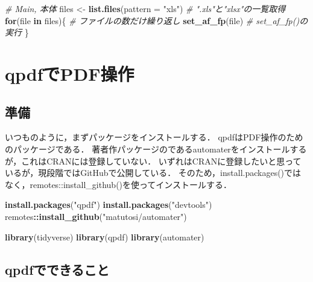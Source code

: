 \documentclass[
]{article}
\newenvironment{Shaded}{\begin{snugshade}}{\end{snugshade}}
\newcommand{\AttributeTok}[1]{\textcolor[rgb]{0.13,0.29,0.53}{#1}}
\newcommand{\CommentTok}[1]{\textcolor[rgb]{0.56,0.35,0.01}{\textit{#1}}}
\newcommand{\ControlFlowTok}[1]{\textcolor[rgb]{0.13,0.29,0.53}{\textbf{#1}}}
\newcommand{\FunctionTok}[1]{\textcolor[rgb]{0.13,0.29,0.53}{\textbf{#1}}}
\newcommand{\NormalTok}[1]{#1}
\newcommand{\OtherTok}[1]{\textcolor[rgb]{0.56,0.35,0.01}{#1}}
\newcommand{\SpecialCharTok}[1]{\textcolor[rgb]{0.81,0.36,0.00}{\textbf{#1}}}
\newcommand{\StringTok}[1]{\textcolor[rgb]{0.31,0.60,0.02}{#1}}
\begin{document}
\begin{Shaded}
\begin{Highlighting}[]
  \CommentTok{\# Main, 本体}
\NormalTok{files }\OtherTok{\textless{}{-}} \FunctionTok{list.files}\NormalTok{(}\AttributeTok{pattern =} \StringTok{"xls"}\NormalTok{) }\CommentTok{\# ".xls"と"xlsx"の一覧取得}
\ControlFlowTok{for}\NormalTok{(file }\ControlFlowTok{in}\NormalTok{ files)\{                  }\CommentTok{\# ファイルの数だけ繰り返し}
  \FunctionTok{set\_af\_fp}\NormalTok{(file)                    }\CommentTok{\# set\_af\_fp()の実行}
\NormalTok{\}}
\end{Highlighting}
\end{Shaded}

\hypertarget{qpdf}{%
\section{qpdfでPDF操作}\label{qpdf}}

\hypertarget{ux6e96ux5099-15}{%
\subsection{準備}\label{ux6e96ux5099-15}}

いつものように，まずパッケージをインストールする．
qpdfはPDF操作のためのパッケージである．
著者作パッケージのであるautomaterをインストールするが，これはCRANには登録していない．
いずれはCRANに登録したいと思っているが，現段階ではGitHubで公開している．
そのため，install.packages()ではなく，remotes::install\_github()を使ってインストールする．

\begin{Shaded}
\begin{Highlighting}[]
\FunctionTok{install.packages}\NormalTok{(}\StringTok{"qpdf"}\NormalTok{)}
\FunctionTok{install.packages}\NormalTok{(}\StringTok{"devtools"}\NormalTok{)}
\NormalTok{remotes}\SpecialCharTok{::}\FunctionTok{install\_github}\NormalTok{(}\StringTok{"matutosi/automater"}\NormalTok{)}
\end{Highlighting}
\end{Shaded}

\begin{Shaded}
\begin{Highlighting}[]
\FunctionTok{library}\NormalTok{(tidyverse)}
\FunctionTok{library}\NormalTok{(qpdf)}
\FunctionTok{library}\NormalTok{(automater)}
\end{Highlighting}
\end{Shaded}

\hypertarget{qpdfux3067ux3067ux304dux308bux3053ux3068}{%
\subsection{qpdfでできること}\label{qpdfux3067ux3067ux304dux308bux3053ux3068}}
\end{document}
